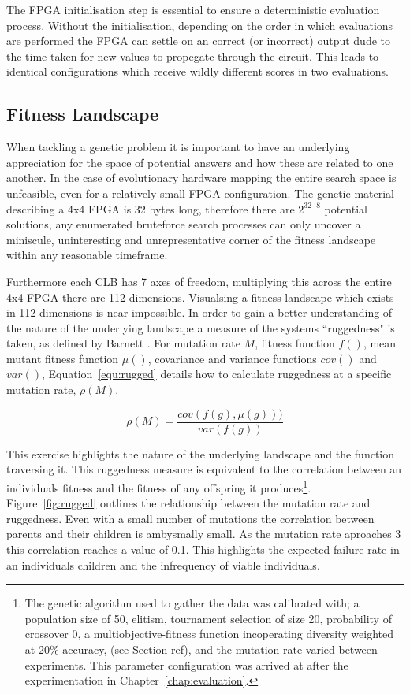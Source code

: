 The FPGA initialisation step is essential to ensure a deterministic evaluation
process. Without the initialisation, depending on the order in which evaluations
are performed the FPGA can settle on an correct (or incorrect) output dude to the
time taken for new values to propegate through the circuit. This leads to identical
configurations which receive wildly different scores in two evaluations.

\subsection{Fitness Landscape}

When tackling a genetic problem it is important to have an underlying appreciation
for the space of potential answers and how these are related to one another.
In the case of evolutionary hardware
mapping the entire search space is unfeasible, even for a relatively small
FPGA configuration.
The genetic material describing a 4x4 FPGA
is 32 bytes long, therefore there are $2^{32\cdot8}$ potential solutions, any
enumerated bruteforce search processes can only uncover a
miniscule, uninteresting and unrepresentative corner of the fitness landscape
within any reasonable timeframe.

Furthermore each CLB has 7 axes of freedom, multiplying this across the entire 4x4 FPGA
there are 112 dimensions. Visualsing a fitness landscape which exists in
112 dimensions is near impossible. In order to gain a better understanding
of the nature of the underlying landscape a measure of the systems ``ruggedness"
is taken, as defined by Barnett \cite{barnett2008ruggedness}. For mutation rate
$M$, fitness function $f()$, mean mutant fitness function $\mu()$, covariance and
variance functions $cov()$ and $var()$, Equation~\ref{equ:rugged} details how to
calculate ruggedness at a specific mutation rate, $\rho(M)$.

\begin{equation}
	\rho(M) = \frac{cov(f(g),\mu(g)))}{var(f(g))}
	\label{equ:rugged}
\end{equation}

This exercise highlights the nature of the underlying landscape and the function
traversing it.
This ruggedness measure is equivalent to the correlation between an individuals
fitness and the fitness of any offspring it produces\footnote{The genetic algorithm
used to gather the data was calibrated with; a population
size of 50, elitism, tournament selection of size 20, probability of crossover 0,
a multiobjective-fitness function incoperating diversity weighted at 20\% accuracy,
(see Section \todo ref), and the mutation rate varied between experiments. This parameter
configuration was arrived at after the experimentation in Chapter~\ref{chap:evaluation}.}.
Figure~\ref{fig:rugged} outlines the relationship between the mutation rate and
ruggedness. Even with a small number of mutations the correlation between parents
and their children is ambysmally small. As the mutation rate aproaches 3 this correlation
reaches a value of 0.1. This highlights the expected failure rate in an individuals children
and the infrequency of viable individuals.


